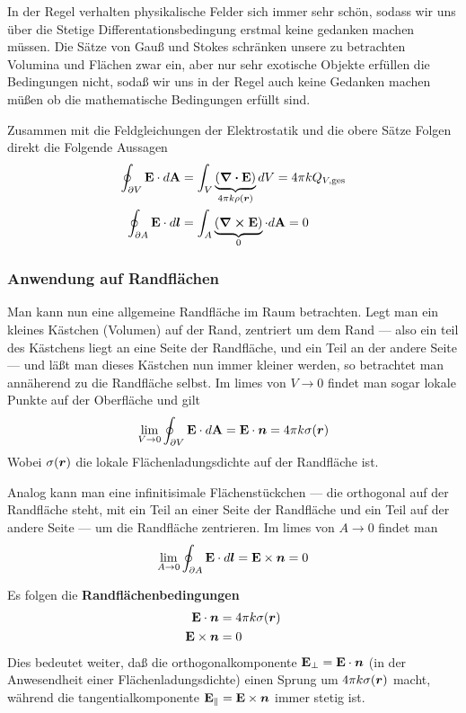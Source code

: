 In der Regel verhalten physikalische Felder sich immer sehr schön, sodass
wir uns über die Stetige Differentationsbedingung erstmal keine gedanken
machen müssen. Die Sätze von Gauß und Stokes schränken unsere zu betrachten
Volumina und Flächen zwar ein, aber nur sehr exotische Objekte erfüllen
die Bedingungen nicht, sodaß wir uns in der Regel auch keine Gedanken
machen müßen ob die mathematische Bedingungen erfüllt sind.

Zusammen mit die Feldgleichungen der Elektrostatik und die obere Sätze
Folgen direkt die Folgende Aussagen
\begin{equation}
  \begin{split}
    \oint_{\partial V} \vb E \cdot d\vb A 
    &
    =\int_V \underbrace{(\div \vb E)}_{4\pi k \rho(\vb*r)} dV
    =4\pi k Q_{V,\text{ges}}\\
    \oint_{\partial A} \vb E \cdot d\vb*l 
    &
    =\int_A \underbrace{(\curl \vb E)}_{0} \cdot d \vb A
    = 0
  \end{split}
\end{equation}

\subsubsection{Anwendung auf Randflächen}%
\label{ssub:anwendungen-auf-randflaechen}
Man kann nun eine allgemeine Randfläche im Raum betrachten. Legt man ein
kleines Kästchen (Volumen) auf der Rand, zentriert um dem Rand --- also ein
teil des Kästchens liegt an eine Seite der Randfläche, und ein Teil an 
der andere Seite --- und läßt man dieses Kästchen nun immer kleiner werden,
so betrachtet man annäherend zu die Randfläche selbst. Im limes von $V\to0$
findet man sogar lokale Punkte auf der Oberfläche und gilt
\begin{equation*}
  \lim_{V \to 0} \oint_{\partial V} \vb E \cdot 
  d\vb A 
  = \vb E \cdot \vb*n= 4\pi k \sigma(\vb*r)
\end{equation*}
Wobei $\sigma(\vb*r)$ die lokale Flächenladungsdichte auf der Randfläche 
ist.

Analog kann man eine infinitisimale Flächenstückchen 
--- die orthogonal auf der 
Randfläche steht, mit ein Teil an einer Seite der Randfläche und ein Teil
auf der andere Seite --- um die Randfläche zentrieren. Im limes von 
$A\to0$ findet man
\begin{equation*}
    \lim_{A \to 0} \oint_{\partial A} \vb E \cdot d\vb*l 
    = \vb E \times \vb*n
    = 0
\end{equation*}

Es folgen die \textbf{Randflächenbedingungen}
\begin{equation}
  \begin{split}
    \vb E \cdot \vb*n &= 4\pi k \sigma(\vb*r) \\
    \vb E \times \vb*n &= 0
  \end{split}
\end{equation}
Dies bedeutet weiter, daß die orthogonalkomponente 
$\vb E_{\perp}= \vb E\cdot \vb*n$ (in der Anwesendheit einer 
Flächenladungsdichte) einen Sprung um $4\pi k \sigma(\vb*r)$ macht, während
die tangentialkomponente $\vb E_{\parallel}=\vb E \times \vb*n$ immer
stetig ist.

